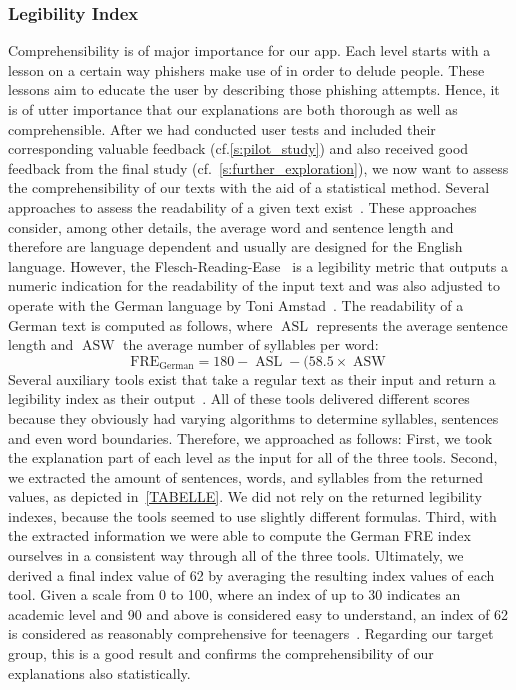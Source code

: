 \subsubsection{Legibility Index}
Comprehensibility is of major importance for our app. Each level starts with a lesson on a certain way phishers make use of in order to delude people. These lessons aim to educate the user by describing those phishing attempts. Hence, it is of utter importance that our explanations are both thorough as well as comprehensible. After we had conducted user tests and included their corresponding valuable feedback (cf.\autoref{s:pilot_study}) and also received good feedback from the final study (cf.~\autoref{s:further_exploration}), we now want to assess the comprehensibility of our texts with the aid of a statistical method. Several approaches to assess the readability of a given text exist~\cite{Gun,citeulike:7369187}. These approaches consider, among other details, the average word and sentence length and therefore are language dependent and usually are designed for the English language. However, the Flesch-Reading-Ease~\cite{citeulike:7369187} is a legibility metric that outputs a numeric indication for the readability of the input text and was also adjusted to operate with the German language by Toni Amstad~\cite{amstad1978verstaendlich}. The readability of a German text is computed as follows, where $\operatorname{ASL}$ represents the average sentence length and $\operatorname{ASW}$ the average number of syllables per word:
$$\operatorname{FRE_{German}} = 180-\operatorname{ASL}-(58.5\times\operatorname{ASW}$$
Several auxiliary tools exist that take a regular text as their input and return a legibility index as their output~\cite{leichtlesbar, stilversprechend,fleschindexde}. All of these tools delivered different scores because they obviously had varying algorithms to determine syllables, sentences and even word boundaries.
Therefore, we approached as follows: First, we took the explanation part of each level as the input for all of the three tools. Second, we extracted the amount of sentences, words, and syllables from the returned values, as depicted in~\autoref{TABELLE}. We did not rely on the returned legibility indexes, because the tools seemed to use slightly different formulas. Third, with the extracted information we were able to compute the German FRE index ourselves in a consistent way through all of the three tools. Ultimately, we derived a final index value of 62 by averaging the resulting index values of each tool. Given a scale from 0 to 100, where an index of up to 30 indicates an academic level and 90 and above is considered easy to understand, an index of 62 is considered as reasonably comprehensive for teenagers~\cite{amstad1978verstandlich}. Regarding our target group, this is a good result and confirms the comprehensibility of our explanations also statistically.
